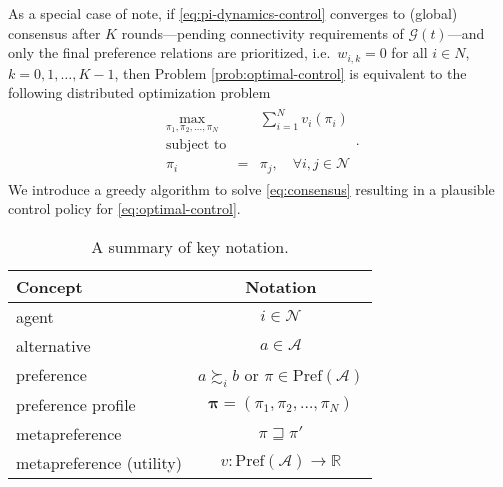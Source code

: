 \documentclass[conference]{ieeeconf}
\newcommand{\R}{\mathbb{R}}
\newcommand{\N}{\mathcal{N}}
\newcommand{\A}{\mathcal{A}}
\renewcommand{\P}{\mathrm{Pref}}
\newcommand{\prefers}{\succsim}
\newcommand{\metaprefers}{\sqsupseteq}
\newcommand{\join}{\vee}
\newcommand{\meet}{\wedge}
\renewcommand{\leq}{\leqslant}
\renewcommand{\geq}{\geqslant}
\begin{document}
As a special case of note, if \eqref{eq:pi-dynamics-control} converges to (global) consensus after $K$ rounds---pending connectivity requirements of $\mathcal{G}(t)$---and only the final preference relations are prioritized, i.e.~$w_{i,k} = 0$ for all $i \in N$, $k = 0,1,\dots,K-1$, then Problem \ref{prob:optimal-control} is equivalent to the following distributed optimization problem
    \begin{align}
        \begin{aligned}
            \max_{\pi_1,\pi_2,\dots,\pi_N} && \sum_{i=1}^N v_i(\pi_i) \\
            \text{subject to} && \\
            \pi_i &=& \pi_j, \quad \forall i,j \in \N
        \end{aligned} \label{eq:consensus}.
    \end{align} 
\noindent We introduce a greedy algorithm to solve \eqref{eq:consensus} resulting in a plausible control policy for \eqref{eq:optimal-control}.


\begin{table}
\centering
\caption{A summary of key notation.}
\label{table:notation}
\begin{tabular}{p{5cm}c}
\toprule
Concept & Notation \\
\midrule
agent & $i \in \N$ \\
alternative & $a \in \A$ \\
preference & $a \prefers_i b$ or $\pi \in \P(\A)$ \\
preference profile & $\boldsymbol{\pi} = \left(\pi_1,\pi_2,\dots,\pi_N\right)$ \\
metapreference & $\pi \metaprefers \pi'$ \\
metapreference (utility) & $v: \P(\A) \to \R$\\
\bottomrule
\end{tabular}
\end{table}
\end{document}
